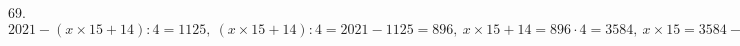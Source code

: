 69. $2021-(x\times15+14):4=1125,\ (x\times15+14):4=2021-1125=896,\ x\times15+14=896\cdot4=3584,\ x\times15=3584-14=3570,\ x=3570:15=238.$\\
